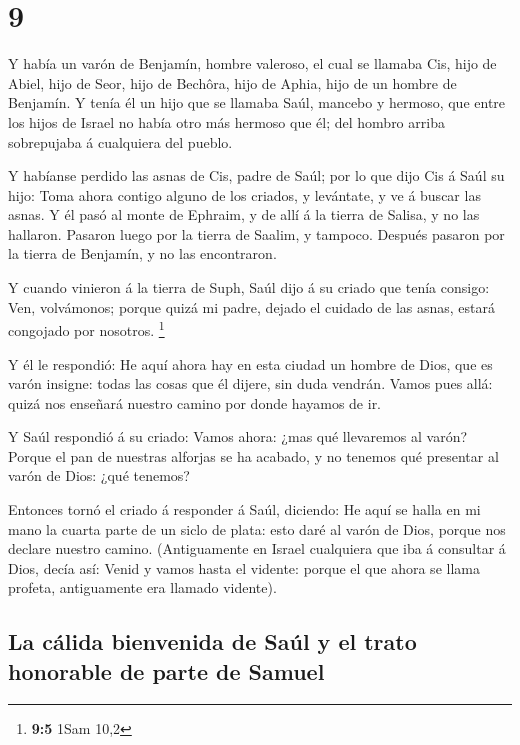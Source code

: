 \hypertarget{section-8}{%
\section{9}\label{section-8}}

 Y había un varón de Benjamín, hombre valeroso, el cual se
llamaba Cis, hijo de Abiel, hijo de Seor, hijo de Bechôra, hijo de
Aphia, hijo de un hombre de Benjamín.  Y tenía él un hijo
que se llamaba Saúl, mancebo y hermoso, que entre los hijos de Israel no
había otro más hermoso que él; del hombro arriba sobrepujaba á
cualquiera del pueblo.

 Y habíanse perdido las asnas de Cis, padre de Saúl; por lo
que dijo Cis á Saúl su hijo: Toma ahora contigo alguno de los criados, y
levántate, y ve á buscar las asnas.  Y él pasó al monte de
Ephraim, y de allí á la tierra de Salisa, y no las hallaron. Pasaron
luego por la tierra de Saalim, y tampoco. Después pasaron por la tierra
de Benjamín, y no las encontraron.

 Y cuando vinieron á la tierra de Suph, Saúl dijo á su
criado que tenía consigo: Ven, volvámonos; porque quizá mi padre, dejado
el cuidado de las asnas, estará congojado por nosotros. \footnote{\textbf{9:5}
  1Sam 10,2}

 Y él le respondió: He aquí ahora hay en esta ciudad un
hombre de Dios, que es varón insigne: todas las cosas que él dijere, sin
duda vendrán. Vamos pues allá: quizá nos enseñará nuestro camino por
donde hayamos de ir.

 Y Saúl respondió á su criado: Vamos ahora: ¿mas qué
llevaremos al varón? Porque el pan de nuestras alforjas se ha acabado, y
no tenemos qué presentar al varón de Dios: ¿qué tenemos?

 Entonces tornó el criado á responder á Saúl, diciendo: He
aquí se halla en mi mano la cuarta parte de un siclo de plata: esto daré
al varón de Dios, porque nos declare nuestro camino. 
(Antiguamente en Israel cualquiera que iba á consultar á Dios, decía
así: Venid y vamos hasta el vidente: porque el que ahora se llama
profeta, antiguamente era llamado vidente).

\hypertarget{la-cuxe1lida-bienvenida-de-sauxfal-y-el-trato-honorable-de-parte-de-samuel}{%
\subsection{La cálida bienvenida de Saúl y el trato honorable de parte
de
Samuel}\label{la-cuxe1lida-bienvenida-de-sauxfal-y-el-trato-honorable-de-parte-de-samuel}}

